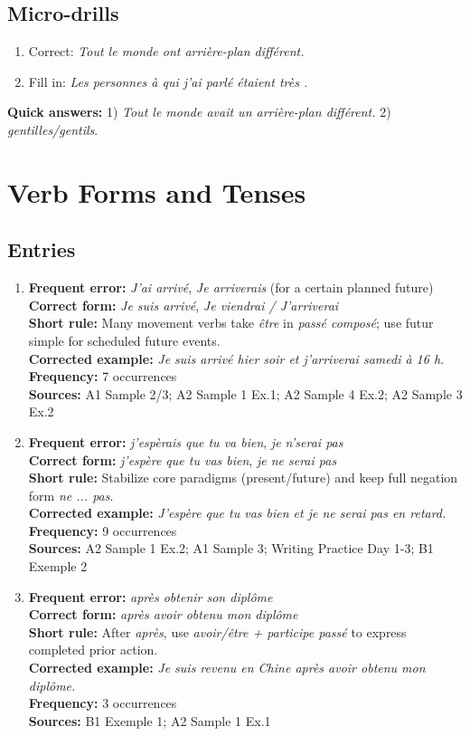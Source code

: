 \documentclass{article}
\newcommand{\mistakeentry}[6]{
\item \textbf{Frequent error:} #1\\
\textbf{Correct form:} #2\\
\textbf{Short rule:} #3\\
\textbf{Corrected example:} #4\\
\textbf{Frequency:} #5\\
\textbf{Sources:} #6
}
\begin{document}
\subsection*{Micro-drills}
\begin{enumerate}
    \item Correct: \textit{Tout le monde ont arrière-plan différent.}
    \item Fill in: \textit{Les personnes à qui j'ai parlé étaient très \underline{\hspace{2cm}}.}
\end{enumerate}
\textbf{Quick answers:} 1) \textit{Tout le monde avait un arrière-plan différent.} 2) \textit{gentilles/gentils}.

\section{Verb Forms and Tenses}
\subsection*{Entries}
\begin{enumerate}
    \mistakeentry
    {\textit{J'ai arrivé}, \textit{Je arriverais} (for a certain planned future)}
    {\textit{Je suis arrivé}, \textit{Je viendrai / J'arriverai}}
    {Many movement verbs take \textit{être} in \textit{passé composé}; use futur simple for scheduled future events.}
    {\textit{Je suis arrivé hier soir et j'arriverai samedi à 16 h.}}
    {7 occurrences}
    {A1 Sample 2/3; A2 Sample 1 Ex.1; A2 Sample 4 Ex.2; A2 Sample 3 Ex.2}

    \mistakeentry
    {\textit{j'espèrais que tu va bien}, \textit{je n'serai pas}}
    {\textit{j'espère que tu vas bien}, \textit{je ne serai pas}}
    {Stabilize core paradigms (present/future) and keep full negation form \textit{ne ... pas}.}
    {\textit{J'espère que tu vas bien et je ne serai pas en retard.}}
    {9 occurrences}
    {A2 Sample 1 Ex.2; A1 Sample 3; Writing Practice Day 1-3; B1 Exemple 2}

    \mistakeentry
    {\textit{après obtenir son diplôme}}
    {\textit{après avoir obtenu mon diplôme}}
    {After \textit{après}, use \textit{avoir/être + participe passé} to express completed prior action.}
    {\textit{Je suis revenu en Chine après avoir obtenu mon diplôme.}}
    {3 occurrences}
    {B1 Exemple 1; A2 Sample 1 Ex.1}
\end{enumerate}
\end{document}
